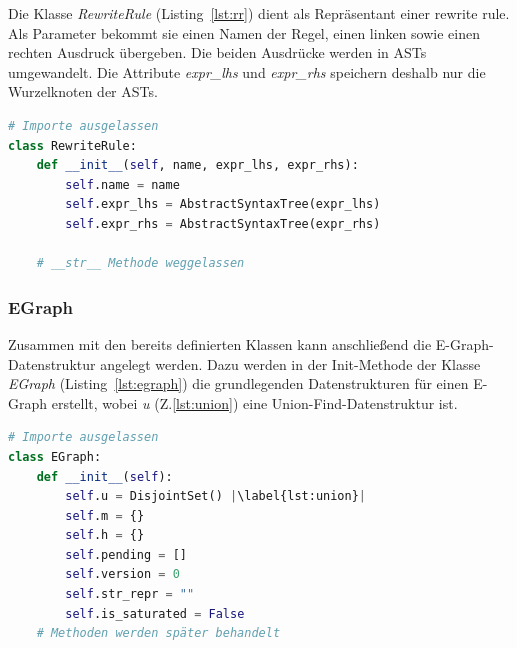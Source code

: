 Die Klasse \textit{RewriteRule} (Listing~\ref{lst:rr}) dient als Repräsentant einer rewrite rule. Als Parameter bekommt sie einen Namen der Regel, einen linken sowie einen 
rechten Ausdruck übergeben. Die beiden Ausdrücke werden in ASTs umgewandelt. Die Attribute \textit{expr\_lhs} und \textit{expr\_rhs} speichern deshalb nur die Wurzelknoten der ASTs.

\begin{lstlisting}[language=Python, caption=Klasse \textit{RewriteRule}, label={lst:rr}]
# Importe ausgelassen 
class RewriteRule:
    def __init__(self, name, expr_lhs, expr_rhs):
        self.name = name
        self.expr_lhs = AbstractSyntaxTree(expr_lhs)
        self.expr_rhs = AbstractSyntaxTree(expr_rhs)

    # __str__ Methode weggelassen 
\end{lstlisting}

\subsubsection{EGraph}

Zusammen mit den bereits definierten Klassen kann anschließend die E-Graph-Datenstruktur angelegt werden. Dazu werden in der Init-Methode der Klasse \textit{EGraph} (Listing~\ref{lst:egraph})
die grundlegenden Datenstrukturen für einen E-Graph erstellt, wobei \textit{u} (Z.\ref{lst:union}) eine Union-Find-Datenstruktur ist.

\begin{lstlisting}[language=Python, escapechar=|, caption=Auszug aus der Klasse \textit{EGraph}, label={lst:egraph}]
# Importe ausgelassen 
class EGraph:
    def __init__(self):
        self.u = DisjointSet() |\label{lst:union}|
        self.m = {}
        self.h = {}
        self.pending = []
        self.version = 0
        self.str_repr = ""
        self.is_saturated = False
    # Methoden werden später behandelt
\end{lstlisting} 

